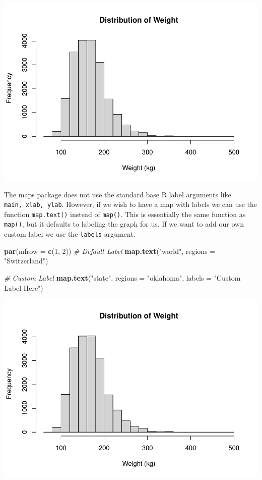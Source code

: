 \documentclass[
]{book}
\newenvironment{Shaded}{\begin{snugshade}}{\end{snugshade}}
\newcommand{\CommentTok}[1]{\textcolor[rgb]{0.56,0.35,0.01}{\textit{#1}}}
\newcommand{\DataTypeTok}[1]{\textcolor[rgb]{0.13,0.29,0.53}{#1}}
\newcommand{\DecValTok}[1]{\textcolor[rgb]{0.00,0.00,0.81}{#1}}
\newcommand{\KeywordTok}[1]{\textcolor[rgb]{0.13,0.29,0.53}{\textbf{#1}}}
\newcommand{\NormalTok}[1]{#1}
\newcommand{\StringTok}[1]{\textcolor[rgb]{0.31,0.60,0.02}{#1}}
\begin{document}
\includegraphics{_main_files/figure-latex/unnamed-chunk-197-1.pdf}

The maps package does not use the standard base R label arguments like \texttt{main,\ xlab,\ ylab}. However, if we wish to have a map with labels we can use the function \texttt{map.text()} instead of \texttt{map()}. This is essentially the same function as \texttt{map()}, but it defaults to labeling the graph for us. If we want to add our own custom label we use the \texttt{labels} argument.

\begin{Shaded}
\begin{Highlighting}[]
\KeywordTok{par}\NormalTok{(}\DataTypeTok{mfrow =} \KeywordTok{c}\NormalTok{(}\DecValTok{1}\NormalTok{, }\DecValTok{2}\NormalTok{))}
\CommentTok{# Default Label}
\KeywordTok{map.text}\NormalTok{(}\StringTok{"world"}\NormalTok{, }\DataTypeTok{regions =} \StringTok{"Switzerland"}\NormalTok{)}

\CommentTok{# Custom Label}
\KeywordTok{map.text}\NormalTok{(}\StringTok{"state"}\NormalTok{, }\DataTypeTok{regions =} \StringTok{"oklahoma"}\NormalTok{, }\DataTypeTok{labels =} \StringTok{"Custom Label Here"}\NormalTok{)}
\end{Highlighting}
\end{Shaded}

\includegraphics{_main_files/figure-latex/unnamed-chunk-198-1.pdf}
\end{document}
